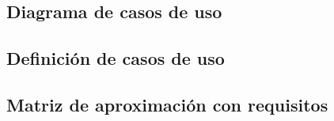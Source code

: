 \subsection{Diagrama de casos de uso}

\subsection{Definición de casos de uso}

\subsection{Matriz de aproximación con requisitos}